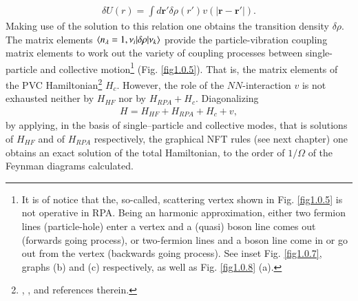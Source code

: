 \begin{align}\label{eq1.0.19}
\delta U(r)=\int d\mathbf r' \delta \rho(r')v\left(|\mathbf r-\mathbf r'|\right).
\end{align}
Making use  of the solution to this relation  one obtains the transition density $\delta\rho$. The matrix elements $\langle {n_\lambda=1, \nu_i|\delta\rho|\nu_k} \rangle$ provide the  particle-vibration coupling matrix elements to work out the variety of coupling processes between single-particle and collective motion\footnote{It is of notice that the, so-called, scattering vertex shown in Fig. \ref{fig1.0.5} is not operative in RPA. Being an harmonic approximation, either two fermion lines (particle-hole) enter a vertex and a (quasi) boson line comes out (forwards going process), or two-fermion lines and a boson line come in or go out from the vertex (backwards going process). See inset Fig. \ref{fig1.0.7}, graphs (b) and (c) respectively, as well as Fig. \ref{fig1.0.8} (a).} (Fig. \ref{fig1.0.5}). That is, the matrix elements of the PVC Hamiltonian\footnote{\label{f14C1}\cite{Mottelson:68}, \cite{Mottelson:67,Hamamoto:69,Hamamoto:70,Hamamoto:70b,Hamamoto:77,Bes:71,Broglia:71b,Broglia:71c,Flynn:71}, and references therein.}  $H_c$. However, the role of the $NN$-interaction $v$ is not exhausted neither by $H_{HF}$ nor by $H_{RPA}+H_c$. Diagonalizing 
\begin{align}\label{eq1.0.19b}
H=H_{HF}+H_{RPA}+H_c+v,
\end{align}
by applying,  in the basis of single--particle and collective modes, that is solutions of $H_{HF}$ and of $H_{RPA}$ respectively, the graphical  NFT rules  (see next chapter) one obtains an exact solution of the total Hamiltonian, to the order of $1/\Omega$ of the Feynman diagrams calculated. 


